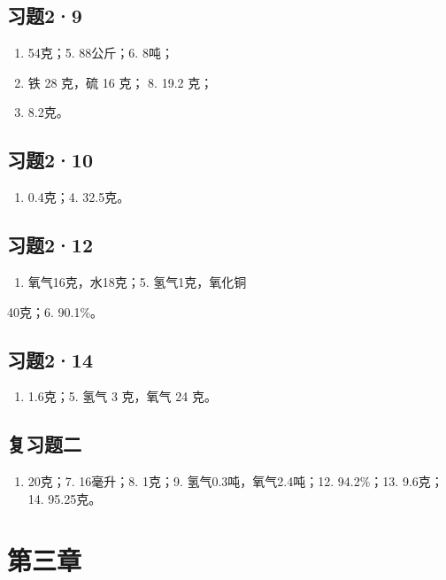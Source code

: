\subsection{习题2·9}

\begin{enumerate}[start=4]
\item
  54克；5. 88公斤；6. 8吨；
\item
  铁 28 克，硫 16 克； 8. 19.2 克；
\item
  8.2克。
\end{enumerate}

\subsection{习题2·10}

\begin{enumerate}[start=3]
\item
  0.4克；4. 32.5克。
\end{enumerate}

\subsection{习题2·12}

\begin{enumerate}[start=4]
\item
  氧气16克，水18克；5. 氢气1克，氧化铜
\end{enumerate}

40克；6. 90.1\%。

\subsection{习题2·14}

\begin{enumerate}[start=4]
\item
  1.6克；5. 氢气 3 克，氧气 24 克。
\end{enumerate}

\subsection{复习题二}

\begin{enumerate}[start=6]
\item
  20克；7. 16毫升；8. 1克；9. 氢气0.3吨，氧气2.4吨；12. 94.2\%；13.
  9.6克；14. 95.25克。
\end{enumerate}

\section{第三章}

